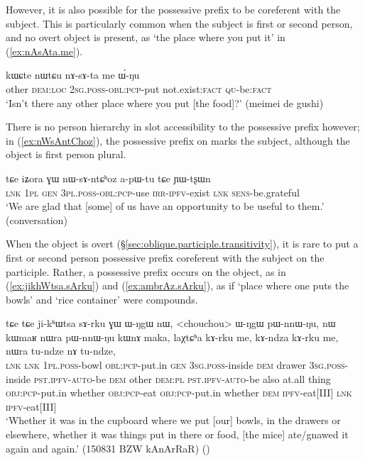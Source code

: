 However, it is also possible for the possessive prefix to be coreferent with the subject. This is particularly common when the subject is first or second person, and no overt object is present, as  `the place where you put it' in (\ref{ex:nAsAta.me}).
 
 \begin{exe}
\ex \label{ex:nAsAta.me}
\gll   kɯɕte nɯtɕu nɤ-sɤ-ta me ɯ́-ŋu \\
other \textsc{dem}:\textsc{loc} \textsc{2sg}.\textsc{poss}-\textsc{obl}:\textsc{pcp}-put not.exist:\textsc{fact} \textsc{qu}-be:\textsc{fact} \\
\glt `Isn't there any other place where you put [the food]?' (meimei de gushi)
 \end{exe} 

There is no person hierarchy in slot accessibility to the possessive prefix however; in (\ref{ex:nWsAntChoz}), the possessive prefix on  marks the subject, although the object is first person plural. 

 \begin{exe}
\ex \label{ex:nWsAntChoz}
\gll  tɕe iʑora ɣɯ nɯ-sɤ-ntɕʰoz a-pɯ-tu tɕe ɲɯ-tʂɯn \\
\textsc{lnk} \textsc{1pl} \textsc{gen} \textsc{3pl}.\textsc{poss}-\textsc{obl}:\textsc{pcp}-use \textsc{irr}-\textsc{ipfv}-exist \textsc{lnk} \textsc{sens}-be.grateful \\
\glt `We are glad that [some] of us have an opportunity to be useful to them.' (conversation)
 \end{exe}
   
When the object is overt (§\ref{sec:oblique.participle.transitivity}), it is rare to put a first or second person possessive prefix coreferent with the subject on the participle. Rather, a possessive prefix occurs on the object, as in (\ref{ex:jikhWtsa.sArku}) and (\ref{ex:ambrAz.sArku}), as if  `place where one puts the bowls' and  `rice container' were compounds.

\begin{exe}
\ex \label{ex:jikhWtsa.sArku}
\gll    tɕe tɕe ji-kʰɯtsa sɤ-rku ɣɯ ɯ-ŋgɯ nɯ, <chouchou> ɯ-ŋgɯ pɯ-nnɯ-ŋu, nɯ kɯmaʁ nɯra pɯ-nnɯ-ŋu kɯnɤ maka, laχtɕʰa kɤ-rku me, kɤ-ndza kɤ-rku me, nɯra tu-ndze nɤ tu-ndze, \\
\textsc{lnk} \textsc{lnk} \textsc{1pl}.\textsc{poss}-bowl \textsc{obl}:\textsc{pcp}-put.in \textsc{gen} \textsc{3sg}.\textsc{poss}-inside \textsc{dem} drawer \textsc{3sg}.\textsc{poss}-inside \textsc{pst}.\textsc{ipfv}-\textsc{auto}-be \textsc{dem} other \textsc{dem}:\textsc{pl} \textsc{pst}.\textsc{ipfv}-\textsc{auto}-be  also at.all thing \textsc{obj}:\textsc{pcp}-put.in whether \textsc{obj}:\textsc{pcp}-eat \textsc{obj}:\textsc{pcp}-put.in whether \textsc{dem} \textsc{ipfv}-eat[III] \textsc{lnk}  \textsc{ipfv}-eat[III] \\
\glt `Whether it was in the cupboard where we put [our] bowls, in the drawers or elsewhere, whether it was things put in there or food, [the mice] ate/gnawed it again and again.' (150831 BZW kAnArRaR)
()
\end{exe} 

